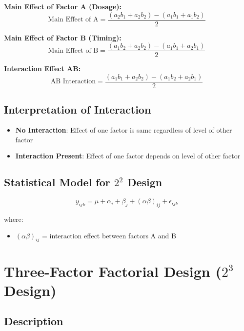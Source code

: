 \documentclass[twoside]{book}
\begin{document}
\textbf{Main Effect of Factor A (Dosage):}
\begin{equation}
\text{Main Effect of A} = \frac{(a_2b_1 + a_2b_2) - (a_1b_1 + a_1b_2)}{2}
\end{equation}

\textbf{Main Effect of Factor B (Timing):}
\begin{equation}
\text{Main Effect of B} = \frac{(a_1b_2 + a_2b_2) - (a_1b_1 + a_2b_1)}{2}
\end{equation}

\textbf{Interaction Effect AB:}
\begin{equation}
\text{AB Interaction} = \frac{(a_1b_1 + a_2b_2) - (a_1b_2 + a_2b_1)}{2}
\end{equation}

\subsection{Interpretation of Interaction}

\begin{itemize}
    \item \textbf{No Interaction}: Effect of one factor is same regardless of level of other factor
    \item \textbf{Interaction Present}: Effect of one factor depends on level of other factor
\end{itemize}

\subsection{Statistical Model for $2^2$ Design}

\begin{equation}
y_{ijk} = \mu + \alpha_i + \beta_j + (\alpha\beta)_{ij} + \epsilon_{ijk}
\end{equation}

where:
\begin{itemize}
    \item $(\alpha\beta)_{ij}$ = interaction effect between factors A and B
\end{itemize}

\section{Three-Factor Factorial Design ($2^3$ Design)}

\subsection{Description}
\end{document}
